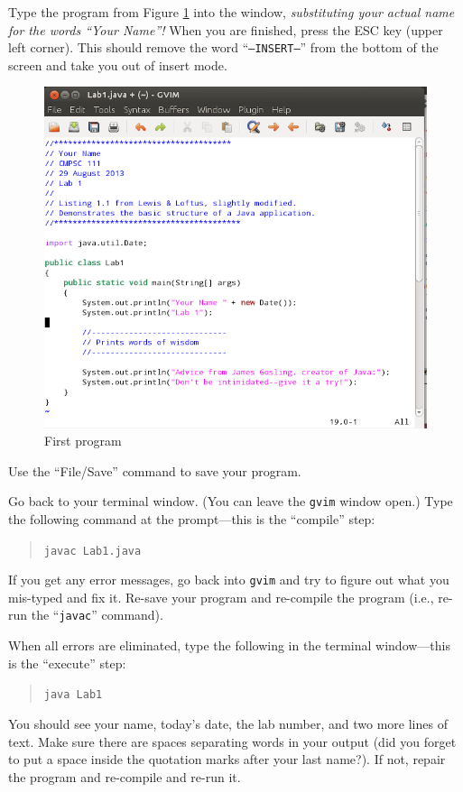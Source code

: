 Type the program from Figure
\ref{lab1prog} into the window, {\em substituting your actual name for the words
``Your Name''!} When you are finished, press the ESC key (upper left corner).
This should remove the word ``{\tt --INSERT--}'' from the bottom of the screen 
and take you out of insert mode.

\begin{figure}[htbp]
\centering
\includegraphics[width=5.8in]{images/lab1prog}
\caption{First program}
\label{lab1prog}
\end{figure}

Use the ``File/Save'' command to save your program.
%

Go back to your terminal window. (You can leave the {\tt gvim} window open.)
Type the following command at the
prompt---this is the ``compile'' step:
\begin{quote}
\verb$javac Lab1.java$
\end{quote}
If you get any error messages, go back into {\tt gvim} and try to figure 
out what you mis-typed and fix it. Re-save your program  and 
re-compile the program (i.e., re-run the ``{\tt javac}'' command).

When all errors are eliminated, type the following in the terminal
window---this is the ``execute'' step:
\begin{quote}
\verb$java Lab1$
\end{quote}
You should see your name, today's date, the lab number, and two more
lines of text. Make sure there are spaces separating words in your output
(did you forget to put a space inside the quotation marks after your
last name?). If not, repair the program and re-compile and re-run it.
%

